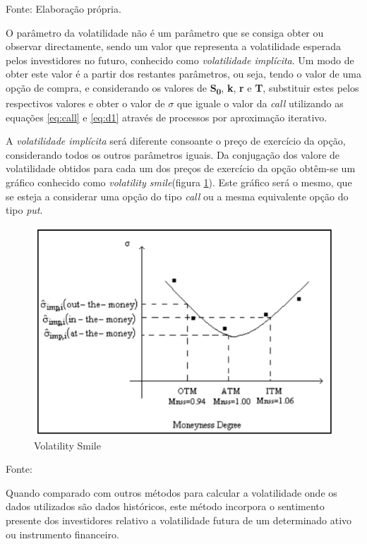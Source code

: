 \documentclass[
  12pt,
  a4paper,
  openany]{book}
\begin{document}
Fonte: Elaboração própria.

\justifying
\bigskip

O parâmetro da volatilidade não é um parâmetro que se consiga obter ou observar directamente, sendo um valor que representa a volatilidade esperada pelos investidores no futuro, conhecido como \emph{volatilidade implícita}. Um modo de obter este valor é a partir dos restantes parâmetros, ou seja, tendo o valor de uma opção de compra, e considerando os valores de \textbf{S\textsubscript{0}}, \textbf{k}, \textbf{r} e \textbf{T}, substituir estes pelos respectivos valores e obter o valor de \textbf{\(\sigma\)} que iguale o valor da \emph{call} utilizando as equações \eqref{eq:call} e \eqref{eq:d1} através de processos por aproximação iterativo.

A \emph{volatilidade implícita} será diferente consoante o preço de exercício da opção, considerando todos os outros parâmetros iguais. Da conjugação dos valore de volatilidade obtidos para cada um dos preços de exercício da opção obtêm-se um gráfico conhecido como \emph{volatility smile}(figura \ref{fig:volatilitysmile}). Este gráfico será o mesmo, que se esteja a considerar uma opção do tipo \emph{call} ou a mesma equivalente opção do tipo \emph{put}.

\bigskip
\begin{figure}

{\centering \includegraphics[width=0.6\linewidth]{image/volatilitysmile} 

}

\caption{Volatility Smile}\label{fig:volatilitysmile}
\end{figure}
\centering

Fonte: \citep[pp.182]{volatilitysmile}

\justifying
\bigskip

Quando comparado com outros métodos para calcular a volatilidade onde os dados utilizados são dados históricos, este método incorpora o sentimento presente dos investidores relativo a volatilidade futura de um determinado ativo ou instrumento financeiro.
\end{document}
